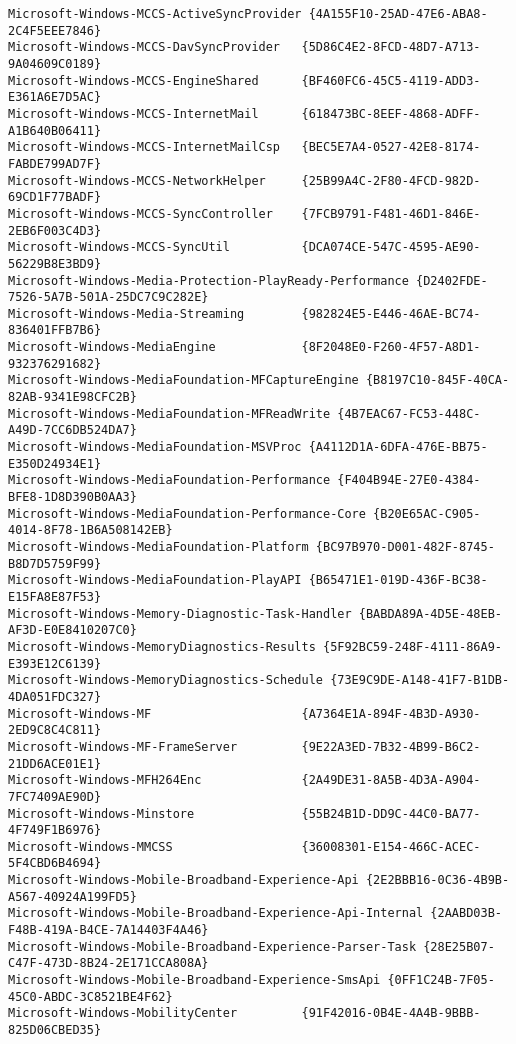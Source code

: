 \documentclass{report}
\begin{document}
\begin{lstlisting}[breaklines=true,basicstyle=\tiny]
Microsoft-Windows-MCCS-ActiveSyncProvider {4A155F10-25AD-47E6-ABA8-2C4F5EEE7846}
Microsoft-Windows-MCCS-DavSyncProvider   {5D86C4E2-8FCD-48D7-A713-9A04609C0189}
Microsoft-Windows-MCCS-EngineShared      {BF460FC6-45C5-4119-ADD3-E361A6E7D5AC}
Microsoft-Windows-MCCS-InternetMail      {618473BC-8EEF-4868-ADFF-A1B640B06411}
Microsoft-Windows-MCCS-InternetMailCsp   {BEC5E7A4-0527-42E8-8174-FABDE799AD7F}
Microsoft-Windows-MCCS-NetworkHelper     {25B99A4C-2F80-4FCD-982D-69CD1F77BADF}
Microsoft-Windows-MCCS-SyncController    {7FCB9791-F481-46D1-846E-2EB6F003C4D3}
Microsoft-Windows-MCCS-SyncUtil          {DCA074CE-547C-4595-AE90-56229B8E3BD9}
Microsoft-Windows-Media-Protection-PlayReady-Performance {D2402FDE-7526-5A7B-501A-25DC7C9C282E}
Microsoft-Windows-Media-Streaming        {982824E5-E446-46AE-BC74-836401FFB7B6}
Microsoft-Windows-MediaEngine            {8F2048E0-F260-4F57-A8D1-932376291682}
Microsoft-Windows-MediaFoundation-MFCaptureEngine {B8197C10-845F-40CA-82AB-9341E98CFC2B}
Microsoft-Windows-MediaFoundation-MFReadWrite {4B7EAC67-FC53-448C-A49D-7CC6DB524DA7}
Microsoft-Windows-MediaFoundation-MSVProc {A4112D1A-6DFA-476E-BB75-E350D24934E1}
Microsoft-Windows-MediaFoundation-Performance {F404B94E-27E0-4384-BFE8-1D8D390B0AA3}
Microsoft-Windows-MediaFoundation-Performance-Core {B20E65AC-C905-4014-8F78-1B6A508142EB}
Microsoft-Windows-MediaFoundation-Platform {BC97B970-D001-482F-8745-B8D7D5759F99}
Microsoft-Windows-MediaFoundation-PlayAPI {B65471E1-019D-436F-BC38-E15FA8E87F53}
Microsoft-Windows-Memory-Diagnostic-Task-Handler {BABDA89A-4D5E-48EB-AF3D-E0E8410207C0}
Microsoft-Windows-MemoryDiagnostics-Results {5F92BC59-248F-4111-86A9-E393E12C6139}
Microsoft-Windows-MemoryDiagnostics-Schedule {73E9C9DE-A148-41F7-B1DB-4DA051FDC327}
Microsoft-Windows-MF                     {A7364E1A-894F-4B3D-A930-2ED9C8C4C811}
Microsoft-Windows-MF-FrameServer         {9E22A3ED-7B32-4B99-B6C2-21DD6ACE01E1}
Microsoft-Windows-MFH264Enc              {2A49DE31-8A5B-4D3A-A904-7FC7409AE90D}
Microsoft-Windows-Minstore               {55B24B1D-DD9C-44C0-BA77-4F749F1B6976}
Microsoft-Windows-MMCSS                  {36008301-E154-466C-ACEC-5F4CBD6B4694}
Microsoft-Windows-Mobile-Broadband-Experience-Api {2E2BBB16-0C36-4B9B-A567-40924A199FD5}
Microsoft-Windows-Mobile-Broadband-Experience-Api-Internal {2AABD03B-F48B-419A-B4CE-7A14403F4A46}
Microsoft-Windows-Mobile-Broadband-Experience-Parser-Task {28E25B07-C47F-473D-8B24-2E171CCA808A}
Microsoft-Windows-Mobile-Broadband-Experience-SmsApi {0FF1C24B-7F05-45C0-ABDC-3C8521BE4F62}
Microsoft-Windows-MobilityCenter         {91F42016-0B4E-4A4B-9BBB-825D06CBED35}

\end{lstlisting}
\end{document}
